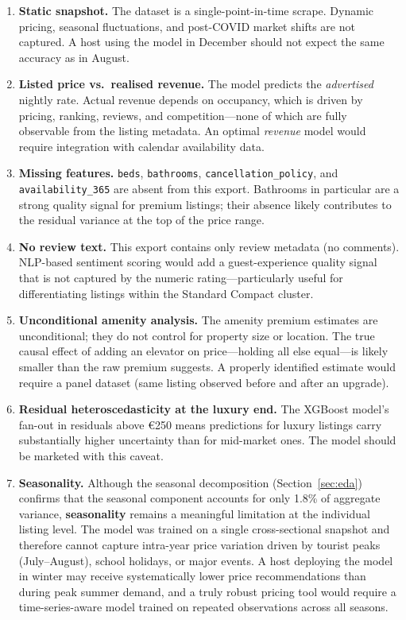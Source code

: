 \documentclass[12pt, a4paper]{article}
\begin{document}
\begin{enumerate}[itemsep=5pt]
  \item \textbf{Static snapshot.} The dataset is a single-point-in-time scrape. Dynamic pricing, seasonal fluctuations, and post-COVID market shifts are not captured. A host using the model in December should not expect the same accuracy as in August.

  \item \textbf{Listed price vs.\ realised revenue.} The model predicts the \textit{advertised} nightly rate. Actual revenue depends on occupancy, which is driven by pricing, ranking, reviews, and competition---none of which are fully observable from the listing metadata. An optimal \textit{revenue} model would require integration with calendar availability data.

  \item \textbf{Missing features.} \texttt{beds}, \texttt{bathrooms}, \texttt{cancellation\_policy}, and \texttt{availability\_365} are absent from this export. Bathrooms in particular are a strong quality signal for premium listings; their absence likely contributes to the residual variance at the top of the price range.

  \item \textbf{No review text.} This export contains only review metadata (no comments). NLP-based sentiment scoring would add a guest-experience quality signal that is not captured by the numeric rating---particularly useful for differentiating listings within the Standard Compact cluster.

  \item \textbf{Unconditional amenity analysis.} The amenity premium estimates are unconditional; they do not control for property size or location. The true causal effect of adding an elevator on price---holding all else equal---is likely smaller than the raw premium suggests. A properly identified estimate would require a panel dataset (same listing observed before and after an upgrade).

  \item \textbf{Residual heteroscedasticity at the luxury end.} The XGBoost model's fan-out in residuals above \euro{}250 means predictions for luxury listings carry substantially higher uncertainty than for mid-market ones. The model should be marketed with this caveat.

  \item \textbf{Seasonality.} Although the seasonal decomposition (Section~\ref{sec:eda}) confirms that the seasonal component accounts for only 1.8\% of aggregate variance, \textbf{seasonality} remains a meaningful limitation at the individual listing level. The model was trained on a single cross-sectional snapshot and therefore cannot capture intra-year price variation driven by tourist peaks (July--August), school holidays, or major events. A host deploying the model in winter may receive systematically lower price recommendations than during peak summer demand, and a truly robust pricing tool would require a time-series-aware model trained on repeated observations across all seasons.
\end{enumerate}
\end{document}
